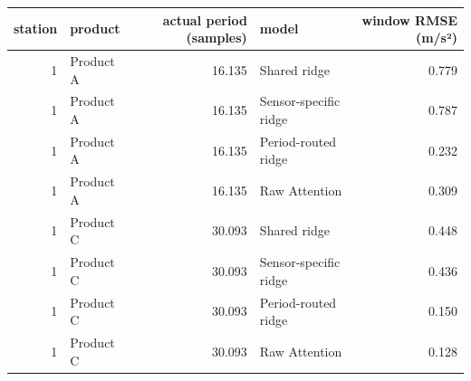 \begin{tabular}{rlrlr}
\toprule
station & product & actual period (samples) & model & window RMSE (m/s²) \\
\midrule
1 & Product A & 16.135 & Shared ridge & 0.779 \\
1 & Product A & 16.135 & Sensor-specific ridge & 0.787 \\
1 & Product A & 16.135 & Period-routed ridge & 0.232 \\
1 & Product A & 16.135 & Raw Attention & 0.309 \\
1 & Product C & 30.093 & Shared ridge & 0.448 \\
1 & Product C & 30.093 & Sensor-specific ridge & 0.436 \\
1 & Product C & 30.093 & Period-routed ridge & 0.150 \\
1 & Product C & 30.093 & Raw Attention & 0.128 \\
\bottomrule
\end{tabular}
